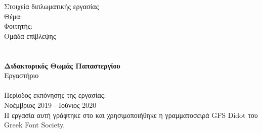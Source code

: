 \pagestyle{empty}
\begin{center}
\Large{Στοιχεία διπλωματικής εργασίας}\\[1cm]
{\large Θέμα:}
\textbf{\large \doctitle}\\[1cm]
\large {Φοιτητής: \textbf{\nomme}\\[1cm]
\large{Ομάδα επίβλεψης}\\
\textbf{\suptitle \, \supname}\\
\textbf{ }\\
\textbf{Διδακτορικός Θωμάς Παπαστεργίου}\\[1cm]
Εργαστήριο\\
\lab \\[1cm]
Περίοδος εκπόνησης της εργασίας:\\ Νοέμβριος 2019 - Ιούνιος 2020\\[1cm]
Η εργασία αυτή γράφτηκε στο \XeLaTeX{} και χρησιμοποιήθηκε η γραμματοσειρά GFS Didot του Greek Font Society.}
\end{center}